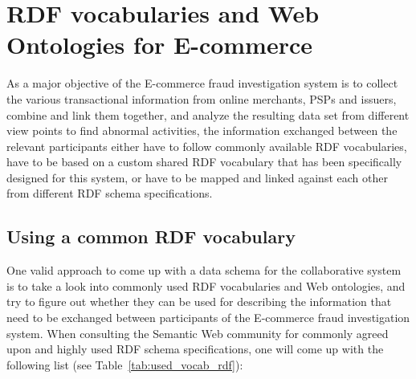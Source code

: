 
\section{\gls{RDF} vocabularies and Web Ontologies for \gls{E-commerce}}
\label{sec:choose_data_schema}

As a major objective of the \gls{E-commerce} fraud investigation system is to collect the various transactional information from online merchants, \gls{PSP}s and issuers, combine and link them together, and analyze the resulting data set from different view points to find abnormal activities, the information exchanged between the relevant participants either have to follow commonly available \gls{RDF} vocabularies, have to be based on a custom shared \gls{RDF} vocabulary that has been specifically designed for this system, or have to be mapped and linked against each other from different \gls{RDF} schema specifications.

\subsection{Using a common \gls{RDF} vocabulary}
\label{subsec:reuse_vocab_web}

One valid approach to come up with a data schema for the collaborative system is to take a look into commonly used \gls{RDF} vocabularies and Web ontologies, and try to figure out whether they can be used for describing the information that need to be exchanged between participants of the \gls{E-commerce} fraud investigation system. When consulting the Semantic Web community for commonly agreed upon and highly used \gls{RDF} schema specifications, one will come up with the following list (see Table~\ref{tab:used_vocab_rdf}):\@

